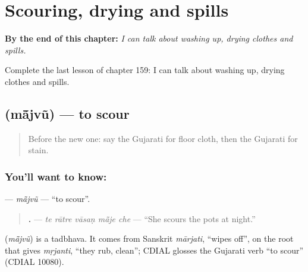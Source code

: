 
\chapter{Scouring, drying and spills}
\label{ch:gu-scouring-drying-and-spills}

\begin{chapteropening}
\textbf{By the end of this chapter:} \emph{I can talk about washing up, drying clothes and spills.}

Complete the last lesson of chapter 159: I can talk about washing up, drying clothes and spills.
\end{chapteropening}

\section[\texorpdfstring{\gu{માંજવું} (mā̃jvũ)}{માંજવું (mā̃jvũ)}]{ (mā̃jvũ) — to scour}

\label{lesson:GU-C159-majvu}



\begin{quote}
Before the new one: say the Gujarati for floor cloth, then the Gujarati for stain.
\end{quote}

\subsection*{You'll want to know: }
\textbf{} — \emph{mā̃jvũ} — \textquotedblleft{}to scour\textquotedblright{}.

\begin{quote}
\textbf{    .} — \emph{te rātre vāsaṇ mā̃je che} — \textquotedblleft{}She scours the pots at night.\textquotedblright{}
\end{quote}

\begin{cousinweb}
\textbf{} (\emph{mā̃jvũ}) is a tadbhava. It comes from Sanskrit \emph{mārjati}, \textquotedblleft{}wipes off\textquotedblright{}, on the root that gives \emph{mṛjanti}, \textquotedblleft{}they rub, clean\textquotedblright{}; CDIAL glosses the Gujarati verb \textquotedblleft{}to scour\textquotedblright{} (CDIAL 10080).
\end{cousinweb}


